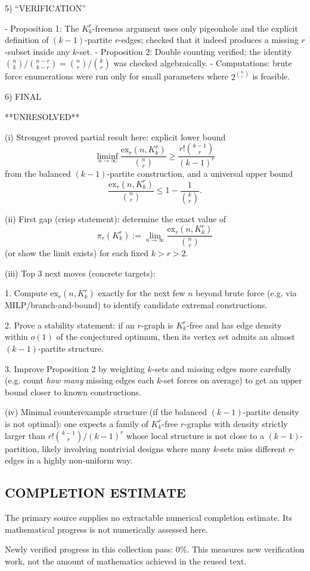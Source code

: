 5) “VERIFICATION”

- Proposition 1: The $K_k^r$-freeness argument uses only pigeonhole and the explicit definition of $(k-1)$-partite $r$-edges; checked that it indeed produces a missing $r$-subset inside any $k$-set.
- Proposition 2: Double counting verified; the identity $\binom{n}{k}/\binom{n-r}{k-r}=\binom{n}{r}/\binom{k}{r}$ was checked algebraically.
- Computations: brute force enumerations were run only for small parameters where $2^{\binom{n}{r}}$ is feasible.

6) FINAL

**UNRESOLVED**

(i) Strongest proved partial result here: explicit lower bound
\[
\liminf_{n\to\infty}\frac{\mathrm{ex}_r(n,K_k^r)}{\binom{n}{r}}\ge \frac{r!\binom{k-1}{r}}{(k-1)^r}
\]
from the balanced $(k-1)$-partite construction, and a universal upper bound
\[
\frac{\mathrm{ex}_r(n,K_k^r)}{\binom{n}{r}}\le 1-\frac{1}{\binom{k}{r}}.
\]

(ii) First gap (crisp statement): determine the exact value of
\[
\pi_r(K_k^r):=\lim_{n\to\infty}\frac{\mathrm{ex}_r(n,K_k^r)}{\binom{n}{r}}
\]
(or show the limit exists) for each fixed $k>r>2$.

(iii) Top 3 next moves (concrete targets):

1. Compute $\mathrm{ex}_r(n,K_k^r)$ exactly for the next few $n$ beyond brute force (e.g. via MILP/branch-and-bound) to identify candidate extremal constructions.

2. Prove a stability statement: if an $r$-graph is $K_k^r$-free and has edge density within $o(1)$ of the conjectured optimum, then its vertex set admits an almost $(k-1)$-partite structure.

3. Improve Proposition 2 by weighting $k$-sets and missing edges more carefully (e.g. count \emph{how many} missing edges each $k$-set forces on average) to get an upper bound closer to known constructions.

(iv) Minimal counterexample structure (if the balanced $(k-1)$-partite density is not optimal): one expects a family of $K_k^r$-free $r$-graphs with density strictly larger than $r!\binom{k-1}{r}/(k-1)^r$ whose local structure is not close to a $(k-1)$-partition, likely involving nontrivial designs where many $k$-sets miss different $r$-edges in a highly non-uniform way.




\subsection*{COMPLETION ESTIMATE}
The primary source supplies no extractable numerical completion estimate. Its mathematical progress is not numerically assessed here.

Newly verified progress in this collection pass: $0\%$. This measures new verification work, not the amount of mathematics achieved in the reused text.
